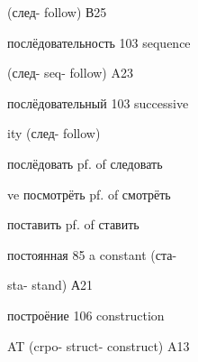 \begin{minipage}[t]{0.475\textwidth}
\noindent (след- follow) В25\par
\noindent послёдовательность 103 sequence\par
\noindent (след- seq- follow) A23\par
\noindent послёдовательный 103 successive\par
\noindent ity (след- follow)\par
\noindent послёдовать pf. of следовать\par
\noindent ve посмотрёть pf. of смотрёть\par
\noindent поставить pf. of ставить\par
\noindent постоянная 85 a constant (ста-\par
\noindent sta- stand) А21\par
\noindent построёние 106 construction\par
{}\par
\noindent AT (crpo- struct- construct) A13\par
\end{minipage}
\endgroup

